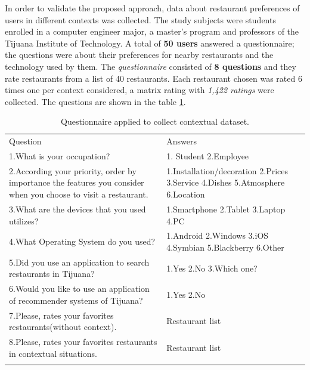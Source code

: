In order to validate the proposed approach, data about restaurant
preferences of users in different contexts was collected. The study
subjects were students enrolled in a computer engineer major, a
master’s program and professors of the Tijuana Institute of
Technology. A total of \textbf{50 users} answered a questionnaire; the
questions were about their preferences for nearby restaurants and the
technology used by them. The \textit{questionnaire} consisted of \textbf{8
questions} and they rate restaurants from a list of 40 restaurants.
Each restaurant chosen was rated 6 times one per context considered, a
matrix rating with \textit{1,422 ratings} were collected. The
questions are shown in the table \ref{tab:questions}.
\begin{table}
\small
\caption{Questionnaire applied to collect contextual dataset.}
\label{tab:questions} 
\centering
\small
\begin{tabular}{p{7cm} p{5cm} }
\hline\noalign{\smallskip}
Question & Answers \\
\noalign{\smallskip}\hline\noalign{\smallskip}
\small{1.What is your occupation?} & \small{1. Student 2.Employee} \\ \hline  
\small{2.According your priority, order by importance the features 
you consider when you choose to visit a restaurant.} & 
\small{1.Installation/decoration 2.Prices 3.Service 4.Dishes
5.Atmosphere 6.Location} \\ \hline  
\small{3.What are the devices that you used
utilizes?} & \small{1.Smartphone 2.Tablet 3.Laptop 4.PC} \\ \hline   
\small{4.What Operating System do you used?} & 
\small{1.Android 2.Windows 3.iOS 4.Symbian 5.Blackberry 6.Other}
\\ \hline  
\small{5.Did you use an application to search restaurants in Tijuana?} &
\small{1.Yes 2.No 3.Which one?} \\ \hline   
\small{6.Would you like to use an application of
recommender systems of Tijuana?} & \small{1.Yes 2.No} \\ \hline  
\small{7.Please, rates your favorites restaurants(without context).} & 
\small{Restaurant list} \\ \hline
\small{8.Please, rates your favorites restaurants in contextual situations.} & 
\small{Restaurant list} \\
\noalign{\smallskip}\hline
\end{tabular}
\end{table}

